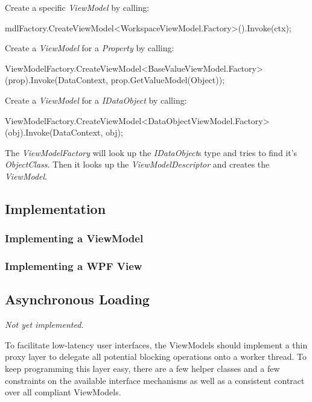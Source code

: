 Create a specific \emph{ViewModel} by calling:

\begin{CS}
	mdlFactory.CreateViewModel<WorkspaceViewModel.Factory>().Invoke(ctx);
\end{CS}

Create a \emph{ViewModel} for a \emph{Property} by calling:

\begin{CS}
	ViewModelFactory.CreateViewModel<BaseValueViewModel.Factory>(prop).Invoke(DataContext,
prop.GetValueModel(Object));
\end{CS}

Create a \emph{ViewModel} for a \emph{IDataObject} by calling:

\begin{CS}
	ViewModelFactory.CreateViewModel<DataObjectViewModel.Factory>(obj).Invoke(DataContext, obj);
\end{CS}

The \emph{ViewModelFactory} will look up the \emph{IDataObject}s type and tries
to find it's \emph{ObjectClass}. Then it looks up the \emph{ViewModelDescriptor}
and creates the \emph{ViewModel}.

\subsection{Implementation}

\subsubsection{Implementing a ViewModel}

\subsubsection{Implementing a WPF View}

\subsection{Asynchronous Loading}

\emph{Not yet implemented.}

To facilitate low-latency user interfaces, the ViewModels should implement a
thin proxy layer to delegate all potential blocking operations onto a worker
thread. To keep programming this layer easy, there are a few helper classes and
a few constraints on the available interface mechanisms as well as a consistent
contract over all compliant ViewModels.

